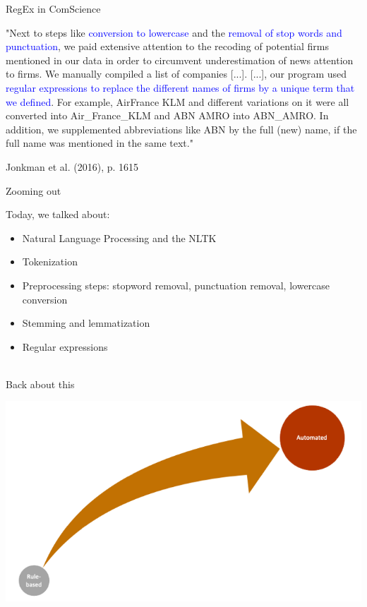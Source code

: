 \documentclass[handout]{beamer}
\begin{document}
\begin{frame}[fragile]{RegEx in ComScience}

\begin{small}
"Next to steps like \textcolor{blue}{conversion to lowercase} and the  \textcolor{blue}{removal of stop words and punctuation}, we paid extensive attention to the recoding of potential firms mentioned in our data in order to circumvent underestimation of news attention to firms. We manually compiled a list of companies [...]. [...], our program used \textcolor{blue}{regular expressions to replace the different names of firms by a unique term that we defined}. For example, AirFrance KLM and different variations on it were all converted into Air\_France\_KLM and ABN AMRO into ABN\_AMRO. In addition, we supplemented abbreviations like ABN by the full (new) name, if the full name was mentioned in the same text."
\end{small}
\begin{tiny}
Jonkman et al. (2016), p. 1615 
\end{tiny}

\end{frame}


\begin{frame}{Zooming out} 
	
Today, we talked about:
\begin{itemize}
	\item Natural Language Processing and the NLTK
	\item Tokenization
	\item Preprocessing steps: stopword removal, punctuation removal, lowercase conversion
	\item Stemming and lemmatization
	\item Regular expressions \\\
\end{itemize}

\end{frame}


\begin{frame}{Back about this}
	
	\begin{center}
		\includegraphics[width=\linewidth,height=\textheight,keepaspectratio]{../pictures/Roadmap.png} 
	\end{center}
	
\end{frame}
\end{document}
